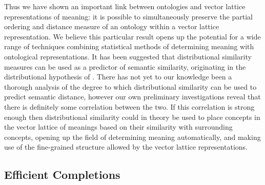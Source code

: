 \documentclass{report}
\begin{document}
Thus we have shown an important link between ontologies and vector lattice representations of meaning: it is possible to simultaneously preserve the partial ordering and distance measure of an ontology within a vector lattice representation. We believe this particular result opens up the potential for a wide range of techniques combining statistical methods of determining meaning with ontological representations. It has been suggested that distributional similarity measures can be used as a predictor of semantic similarity, originating in the distributional hypothesis of \cite{Harris:68}. There has not yet to our knowledge been a thorough analysis of the degree to which distributional similarity can be used to predict semantic distance, however our own preliminary investigations reveal that there is definitely some correlation between the two. If this correlation is strong enough then distributional similarity could in theory be used to place concepts in the vector lattice of meanings based on their similarity with surrounding concepts, opening up the field of determining meaning automatically, and making use of the fine-grained structure allowed by the vector lattice representations.


\subsection{Efficient Completions}
\end{document}
